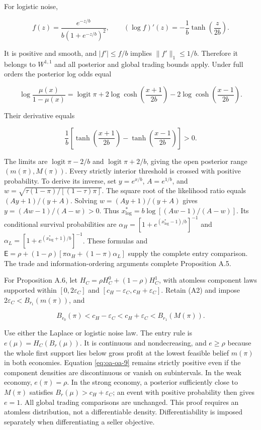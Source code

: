 \documentclass[
  11pt,
]{article}
\begin{document}
For logistic noise,

\[
f(z)=\frac{e^{-z/b}}{b(1+e^{-z/b})^2},\qquad
(\log f)'(z)=-\frac1b\tanh\left(\frac z{2b}\right).
\tag{OA.23}\label{eq:oa-oa-23}
\]

It is positive and smooth, and \(|f'|\le f/b\) implies
\(\|f'\|_1\le1/b\). Therefore it belongs to \(W^{1,1}\) and all
posterior and global trading bounds apply. Under full orders the
posterior log odds equal

\[
\log\frac{\mu(x)}{1-\mu(x)}
=\operatorname{logit}\pi
+2\log\cosh\left(\frac{x+1}{2b}\right)
-2\log\cosh\left(\frac{x-1}{2b}\right).
\tag{OA.24}\label{eq:oa-oa-24}
\]

Their derivative equals

\[
\frac1b\left[\tanh\left(\frac{x+1}{2b}\right)-\tanh\left(\frac{x-1}{2b}\right)\right]>0.
\tag{OA.25}\label{eq:oa-oa-25}
\]

The limits are \(\operatorname{logit}\pi-2/b\) and
\(\operatorname{logit}\pi+2/b\), giving the open posterior range
\((m(\pi),M(\pi))\). Every strictly interior threshold is crossed with positive
probability. To derive its inverse, set \(y=e^{x/b}\), \(A=e^{1/b}\),
and \(w=\sqrt{\tau(1-\pi)/[(1-\tau)\pi]}\). The square root of the likelihood ratio
equals \((Ay+1)/(y+A)\). Solving \(w=(Ay+1)/(y+A)\) gives
\(y=(Aw-1)/(A-w)>0\). Thus \(x^*_{\log}=b\log[(Aw-1)/(A-w)]\). Its
conditional survival probabilities are
\(\alpha_H=[1+e^{(x^*_{\log}-1)/b}]^{-1}\) and
\(\alpha_L=[1+e^{(x^*_{\log}+1)/b}]^{-1}\). These formulas and
\(\mathsf E=\rho+(1-\rho)[\pi\alpha_H+(1-\pi)\alpha_L]\) supply the complete
entry comparison. The trade and information-ordering arguments complete
Proposition A.5.

For Proposition A.6, let \(H_C=\rho H_C^0+(1-\rho)H_C^1\), with atomless
component laws supported within
\([0,2\varepsilon_C]\) and
\([c_H-\varepsilon_C,c_H+\varepsilon_C]\). Retain (A2) and impose
\(2\varepsilon_C<B_{r_1}(m(\pi))\), and

\[
B_{r_0}(\pi)<c_H-\varepsilon_C<c_H+\varepsilon_C<B_{r_1}(M(\pi)).
\tag{OA.26}\label{eq:oa-oa-26}
\]

Use either the Laplace or logistic noise law. The entry rule is
\(e(\mu)=H_C(B_r(\mu))\). It is continuous and nondecreasing, and
\(e\ge\rho\) because the whole first support lies below gross profit at the
lowest feasible belief \(m(\pi)\) in both economies. Equation
\eqref{eq:oa-oa-9} remains strictly positive even if the component
densities are discontinuous or vanish on subintervals. In the weak
economy, \(e(\pi)=\rho\). In the strong economy, a posterior
sufficiently close to \(M(\pi)\) satisfies \(B_r(\mu)>c_H+\varepsilon_C\); an
event with positive probability then gives \(e=1\). All global trading
comparisons are unchanged. This proof requires an atomless distribution,
not a differentiable density. Differentiability is imposed separately
when differentiating a seller objective.
\end{document}

